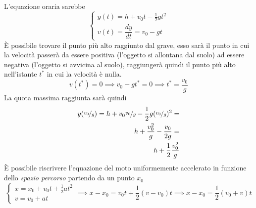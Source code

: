 \documentclass[10pt, letterpaper]{report}
\begin{document}
L'equazione oraria sarebbe$$ \begin{cases}
    y(t)=h+v_0t-\frac{1}{2}gt^2 \\ 
    v(t)=\dfrac{dy}{dt}=v_0-gt
\end{cases}$$
È possibile trovare il punto più alto raggiunto dal grave, esso sarà il punto in cui la velocità 
passerà da essere positiva (l'oggetto si allontana dal suolo) ad essere negativa (l'oggetto si avvicina al suolo), 
raggiungerà quindi il punto più alto nell'istante $t^*$ in cui la velocità è nulla. 
$$ v(t^*)=0\implies v_0-gt^* = 0 \implies t^*=\frac{v_0}{g}$$
La quota massima raggiunta sarà quindi 
\begin{eqnarray}
    y(\nicefrac{v_0}{g}) = h+v_0\nicefrac{v_0}{g}-\frac{1}{2}g(\nicefrac{v_0}{g})^2 =\\ 
    h+\frac{v_0^2}{g}-\frac{v_0}{2g} = \\ 
    h+\frac{1}{2}\frac{v_0^2}{g}
\end{eqnarray}
È possibile riscrivere l'equazione del moto uniformemente accelerato in funzione dello 
\textit{spazio percorso} partendo da un punto $x_0$ 
$$ \begin{cases}
    x=x_0+v_0t+\frac{1}{2}at^2\\ 
    v=v_0+at
\end{cases}\implies x-x_0=v_0t+\frac{1}{2}(v-v_0)t \implies x-x_0=\frac{1}{2}(v_0+v)t$$
\end{document}
